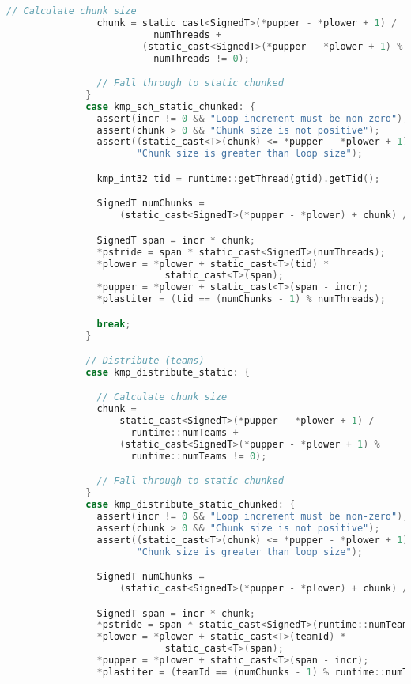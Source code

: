 \begin{itemize}
\begin{lstlisting}[language=C, caption={void Team::forStaticInit},
          label={lst:team-forstaticinit}, escapechar=@]
                // Calculate chunk size
                chunk = static_cast<SignedT>(*pupper - *plower + 1) /
                          numThreads +
                        (static_cast<SignedT>(*pupper - *plower + 1) %
                          numThreads != 0);

                // Fall through to static chunked
              }
              case kmp_sch_static_chunked: {
                assert(incr != 0 && "Loop increment must be non-zero");
                assert(chunk > 0 && "Chunk size is not positive");
                assert((static_cast<T>(chunk) <= *pupper - *plower + 1) &&
                       "Chunk size is greater than loop size");

                kmp_int32 tid = runtime::getThread(gtid).getTid();

                SignedT numChunks =
                    (static_cast<SignedT>(*pupper - *plower) + chunk) / chunk;

                SignedT span = incr * chunk;
                *pstride = span * static_cast<SignedT>(numThreads);
                *plower = *plower + static_cast<T>(tid) *
                            static_cast<T>(span);
                *pupper = *plower + static_cast<T>(span - incr);
                *plastiter = (tid == (numChunks - 1) % numThreads);

                break;
              }

              // Distribute (teams)
              case kmp_distribute_static: {

                // Calculate chunk size
                chunk =
                    static_cast<SignedT>(*pupper - *plower + 1) /
                      runtime::numTeams +
                    (static_cast<SignedT>(*pupper - *plower + 1) %
                      runtime::numTeams != 0);

                // Fall through to static chunked
              }
              case kmp_distribute_static_chunked: {
                assert(incr != 0 && "Loop increment must be non-zero");
                assert(chunk > 0 && "Chunk size is not positive");
                assert((static_cast<T>(chunk) <= *pupper - *plower + 1) &&
                       "Chunk size is greater than loop size");

                SignedT numChunks =
                    (static_cast<SignedT>(*pupper - *plower) + chunk) / chunk;

                SignedT span = incr * chunk;
                *pstride = span * static_cast<SignedT>(runtime::numTeams);
                *plower = *plower + static_cast<T>(teamId) *
                            static_cast<T>(span);
                *pupper = *plower + static_cast<T>(span - incr);
                *plastiter = (teamId == (numChunks - 1) % runtime::numTeams);


\end{lstlisting}
\end{itemize}
